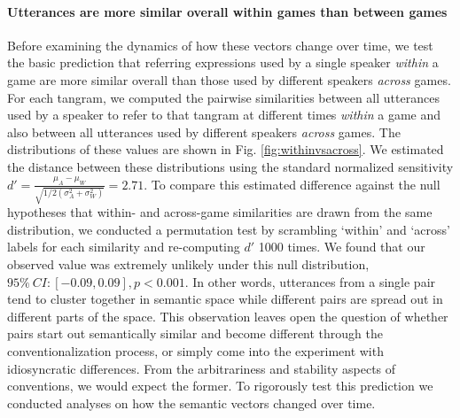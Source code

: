 \documentclass[alpha-refs]{wiley-article}
\begin{document}
\paragraph{Utterances are more similar overall within games than between games}  
Before examining the dynamics of how these vectors change over time, we test the basic prediction that referring expressions used by a single speaker \emph{within} a game are more similar overall than those used by different speakers \emph{across} games.
For each tangram, we computed the pairwise similarities between all utterances used by a speaker to refer to that tangram at different times \emph{within} a game and also between all utterances used by different speakers \emph{across} games. 
The distributions of these values are shown in Fig. \ref{fig:withinvsacross}.
We estimated the distance between these distributions using the standard normalized sensitivity $d' = \frac{\mu_A - \mu_W}{\sqrt{1/2(\sigma^2_A+\sigma^2_W)}} = 2.71$.
To compare this estimated difference against the null hypotheses that within- and across-game similarities are drawn from the same distribution, we conducted a permutation test by scrambling `within' and `across' labels for each similarity and re-computing $d'$ 1000 times. 
We found that our observed value was extremely unlikely under this null distribution, $95\%~CI: [-0.09, 0.09], p < 0.001$. 
In other words, utterances from a single pair tend to cluster together in semantic space while different pairs are spread out in different parts of the space.
This observation leaves open the question of whether pairs start out semantically similar and become different through the conventionalization process, or simply come into the experiment with idiosyncratic differences.
From the arbitrariness and stability aspects of conventions, we would expect the former.
To rigorously test this prediction we conducted analyses on how the semantic vectors changed over time.
\end{document}
